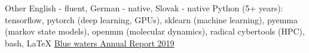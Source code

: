 
\begin{rubric}{Other}
\noentry{}
\entry*[Languages] 
 English - fluent, German - native, Slovak - native
	Python (5+ years): tensorflow, pytorch (deep learning, GPUs), sklearn (machine learning), pyemma (markov state models), openmm (molecular dynamics), radical cybertools (HPC), bash, \LaTeX
{}
   \href{https://bluewaters.ncsa.illinois.edu/liferay-content/document-library/BW-Annual-Report-2019/jha_proteins.pdf}{Blue waters Annual Report 2019\small{\faLink}}
\end{rubric}

